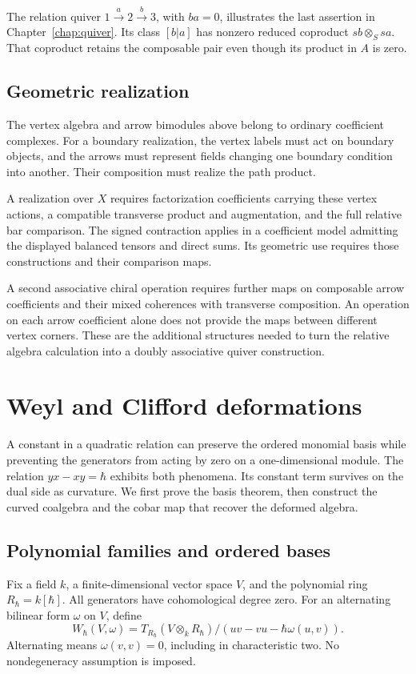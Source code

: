 The relation quiver $1\xrightarrow{a}2\xrightarrow{b}3$, with $ba=0$, illustrates the last assertion in Chapter~\ref{chap:quiver}.
Its class $[b|a]$ has nonzero reduced coproduct $sb\otimes_Ssa$.
That coproduct retains the composable pair even though its product in $A$ is zero.

\section{Geometric realization}

The vertex algebra and arrow bimodules above belong to ordinary coefficient complexes.
For a boundary realization, the vertex labels must act on boundary objects, and the arrows must represent fields changing one boundary condition into another.
Their composition must realize the path product.

A realization over $X$ requires factorization coefficients carrying these vertex actions, a compatible transverse product and augmentation, and the full relative bar comparison.
The signed contraction applies in a coefficient model admitting the displayed balanced tensors and direct sums.
Its geometric use requires those constructions and their comparison maps.

A second associative chiral operation requires further maps on composable arrow coefficients and their mixed coherences with transverse composition.
An operation on each arrow coefficient alone does not provide the maps between different vertex corners.
These are the additional structures needed to turn the relative algebra calculation into a doubly associative quiver construction.

\chapter{Weyl and Clifford deformations}\label{cbc:weyl:chapter}

A constant in a quadratic relation can preserve the ordered monomial basis while preventing the generators from acting by zero on a one-dimensional module.
The relation $yx-xy=\hbar$ exhibits both phenomena.
Its constant term survives on the dual side as curvature.
We first prove the basis theorem, then construct the curved coalgebra and the cobar map that recover the deformed algebra.

\section{Polynomial families and ordered bases}
Fix a field $k$, a finite-dimensional vector space $V$, and the polynomial ring $R_\hbar=k[\hbar]$.
All generators have cohomological degree zero.
For an alternating bilinear form $\omega$ on $V$, define
\[
 W_\hbar(V,\omega)
 =T_{R_\hbar}(V\otimes_k R_\hbar)/
   (uv-vu-\hbar\omega(u,v)).
\]
Alternating means $\omega(v,v)=0$, including in characteristic two.
No nondegeneracy assumption is imposed.

